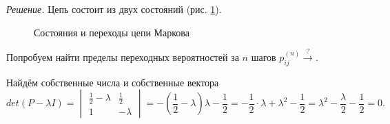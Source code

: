\textit{Решение.}
Цепь состоит из двух состояний (рис. \ref{fig:167}).

\begin{figure}[h]
  \centering
  
  \caption{Состояния и переходы цепи Маркова}
  \label{fig:167}
\end{figure}

Попробуем найти пределы переходных вероятностей за $n$ шагов
$p_{ij}^{ \left( n \right) } \overset{?}{ \to }$.

Найдём собственные числа и собственные вектора
\begin{equation*}
  det \left( P - \lambda I \right) =
  \begin{vmatrix}
    \frac{1}{2} - \lambda & \frac{1}{2} \\
    1                     & -\lambda
  \end{vmatrix} =
  - \left( \frac{1}{2} - \lambda \right) \lambda - \frac{1}{2} =
  -\frac{1}{2} \cdot \lambda + \lambda^2 - \frac{1}{2} =
  \lambda^2 - \frac{ \lambda }{2} - \frac{1}{2} =
  0.
\end{equation*}
